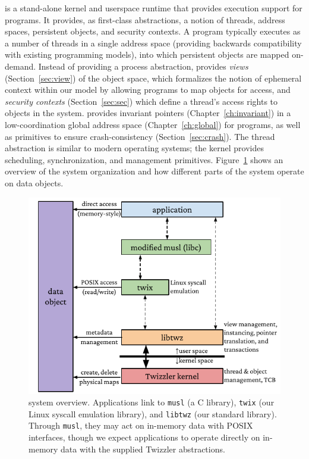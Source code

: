 \Twizzler is a stand-alone kernel and userspace runtime that provides execution support
for programs. It provides, as first-class abstractions, a notion of threads, address spaces,
persistent objects, and security contexts. A program
typically executes as a number of threads in a single address space (providing backwards
compatibility with existing programming models), into which persistent objects are mapped on-demand.
Instead of providing a process abstraction, \Twizzler provides \emph{views}
(Section~\ref{sec:view}) of the object space, which formalizes the notion of ephemeral context within our
model by allowing programs to map objects for access,
and \emph{security contexts} (Section~\ref{sec:sec}) which define a thread's access rights to objects in the system.
\Twizzler provides invariant pointers (Chapter~\ref{ch:invariant}) in a low-coordination global address space (Chapter~\ref{ch:global}) for
programs, as well as primitives to ensure crash-consistency
(Section~\ref{sec:crash}). The thread abstraction is similar to modern operating systems; the
kernel provides scheduling, synchronization, and management primitives.
Figure~\ref{fig:twz_sys_overview} shows an overview of the system
organization and how different parts of the system operate on data objects.

\begin{figure}
    \centering
    \includegraphics[width=\linewidth]{fig/twz_sys_diag}
    \caption{\Twizzler system overview. Applications link to \texttt{musl} (a C library),
        \texttt{twix} (our Linux syscall emulation library), and \texttt{libtwz} (our standard
        library). Through \texttt{musl}, they may act on in-memory data with POSIX interfaces,
        though we expect \Twizzler applications to operate directly on in-memory data with
        the supplied Twizzler abstractions.}
    \label{fig:twz_sys_overview}
\end{figure}


